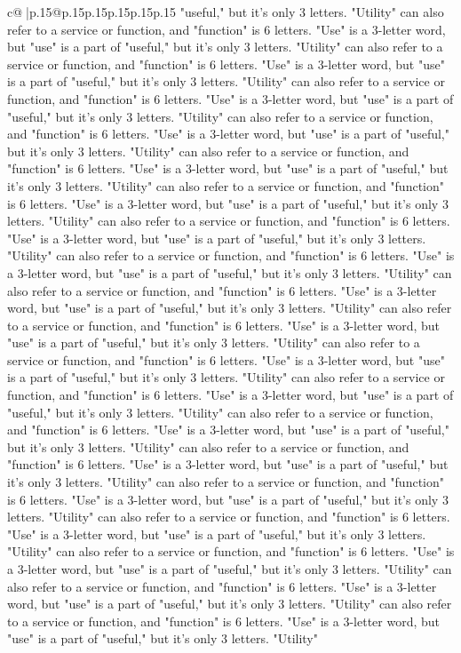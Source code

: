 \documentclass{article}
\begin{document}
{\begin{supertabular}{c@{$\;$}|p{.15\linewidth}@{}p{.15\linewidth}p{.15\linewidth}p{.15\linewidth}p{.15\linewidth}p{.15\linewidth}}
{{{"useful," but it's only 3 letters. "Utility" can also refer to a service or function, and "function" is 6 letters. "Use" is a 3{-}letter word, but "use" is a part of "useful," but it's only 3 letters. "Utility" can also refer to a service or function, and "function" is 6 letters. "Use" is a 3{-}letter word, but "use" is a part of "useful," but it's only 3 letters. "Utility" can also refer to a service or function, and "function" is 6 letters. "Use" is a 3{-}letter word, but "use" is a part of "useful," but it's only 3 letters. "Utility" can also refer to a service or function, and "function" is 6 letters. "Use" is a 3{-}letter word, but "use" is a part of "useful," but it's only 3 letters. "Utility" can also refer to a service or function, and "function" is 6 letters. "Use" is a 3{-}letter word, but "use" is a part of "useful," but it's only 3 letters. "Utility" can also refer to a service or function, and "function" is 6 letters. "Use" is a 3{-}letter word, but "use" is a part of "useful," but it's only 3 letters. "Utility" can also refer to a service or function, and "function" is 6 letters. "Use" is a 3{-}letter word, but "use" is a part of "useful," but it's only 3 letters. "Utility" can also refer to a service or function, and "function" is 6 letters. "Use" is a 3{-}letter word, but "use" is a part of "useful," but it's only 3 letters. "Utility" can also refer to a service or function, and "function" is 6 letters. "Use" is a 3{-}letter word, but "use" is a part of "useful," but it's only 3 letters. "Utility" can also refer to a service or function, and "function" is 6 letters. "Use" is a 3{-}letter word, but "use" is a part of "useful," but it's only 3 letters. "Utility" can also refer to a service or function, and "function" is 6 letters. "Use" is a 3{-}letter word, but "use" is a part of "useful," but it's only 3 letters. "Utility" can also refer to a service or function, and "function" is 6 letters. "Use" is a 3{-}letter word, but "use" is a part of "useful," but it's only 3 letters. "Utility" can also refer to a service or function, and "function" is 6 letters. "Use" is a 3{-}letter word, but "use" is a part of "useful," but it's only 3 letters. "Utility" can also refer to a service or function, and "function" is 6 letters. "Use" is a 3{-}letter word, but "use" is a part of "useful," but it's only 3 letters. "Utility" can also refer to a service or function, and "function" is 6 letters. "Use" is a 3{-}letter word, but "use" is a part of "useful," but it's only 3 letters. "Utility" can also refer to a service or function, and "function" is 6 letters. "Use" is a 3{-}letter word, but "use" is a part of "useful," but it's only 3 letters. "Utility" can also refer to a service or function, and "function" is 6 letters. "Use" is a 3{-}letter word, but "use" is a part of "useful," but it's only 3 letters. "Utility" can also refer to a service or function, and "function" is 6 letters. "Use" is a 3{-}letter word, but "use" is a part of "useful," but it's only 3 letters. "Utility" can also refer to a service or function, and "function" is 6 letters. "Use" is a 3{-}letter word, but "use" is a part of "useful," but it's only 3 letters. "Utility" }}}
\end{supertabular}}
\end{document}
